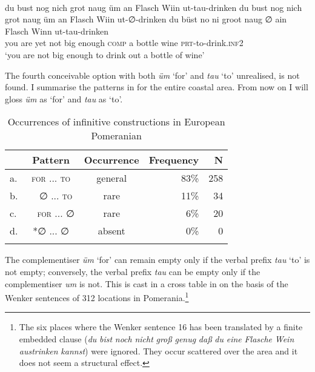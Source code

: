 \documentclass[output=paper,hidelinks,draftmode]{langscibook}
\begin{document}
\ea\label{ex:postma:3} \\
\ea\label{ex:postma:3a} du bust nog nich grot naug üm an Flasch Wiin ut-tau-drinken
\ex\label{ex:postma:3b} du bust nog nich grot naug üm an Flasch Wiin ut-∅-drinken
\ex\label{ex:postma:3c} \gll du büst no ni groot naug ∅ ain Flasch Winn ut-tau-drinken\\
     you are yet not big enough \textsc{comp} a bottle wine \textsc{prt}{}-to-drink.\textsc{inf2}\\
\glt `you are not big enough to drink out a bottle of wine' \z\z

The fourth conceivable option with both \textit{üm} `for' and \textit{tau} `to' unrealised, is not found. I summarise the patterns in  for the entire coastal area. From now on I will gloss \textit{üm} as `for' and \textit{tau} as `to'.


\begin{table}
	\begin{tabularx}{.8\textwidth}{lCCrr}
		\lsptoprule
& Pattern & Occurrence & Frequency & N\\ \midrule
a.& { }\textsc{for} ... \textsc{to} & general & 83\% & 258\\
b. & ~~∅ ... \textsc{to} & rare & 11\% & 34\\
c. & ~~\textsc{for} ... ∅ & rare & 6\% & 20\\
d. & *∅ ... ∅ & absent & 0\% & 0\\\lspbottomrule
	\end{tabularx}
\caption{Occurrences of infinitive constructions in European Pomeranian}
\label{tab:postma:2}
\end{table}


\largerpage[2]
The complementiser \textit{üm} `for' can remain empty only if the verbal prefix \textit{tau} `to' is not empty; conversely, the verbal prefix \textit{tau} can be empty only if the complementiser \textit{um} is not. This is cast in a cross table in  on the basis of the Wenker sentences of 312 locations in Pomerania.\footnote{The six places where the Wenker sentence 16 has been translated by a finite embedded clause (\textit{du} \textit{bist} \textit{noch} \textit{nicht} \textit{groß} \textit{genug} \textit{daß} \textit{du} \textit{eine} \textit{Flasche} \textit{Wein} \textit{austrinken} \textit{kannst}) were ignored. They occur scattered over the area and it does not seem a structural effect.}
\end{document}
